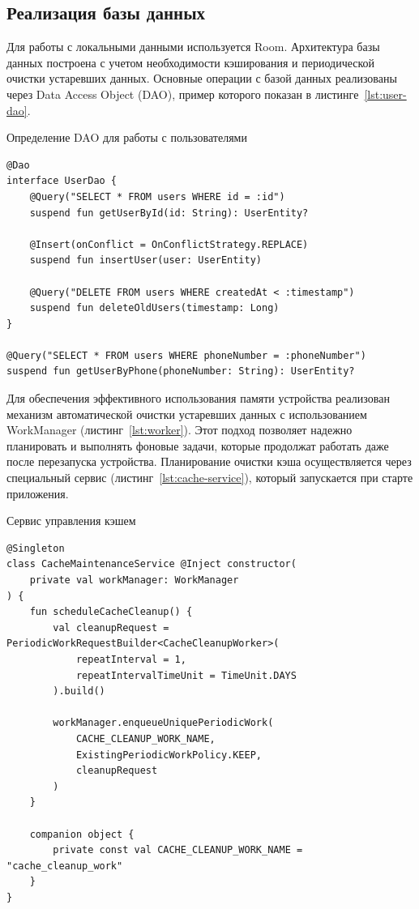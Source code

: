\documentclass[14pt, russian]{scrartcl}
\begin{document}
\subsection{Реализация базы данных}\label{sect:database}

Для работы с локальными данными используется Room. Архитектура базы данных построена с учетом необходимости кэширования и периодической очистки устаревших данных. Основные операции с базой данных реализованы через Data Access Object (DAO), пример которого показан в листинге~\ref{lst:user-dao}.

\begin{listing}[!htb]
\caption{Определение DAO для работы с пользователями}
\vspace{-0.3cm}
\label{lst:user-dao}
\begin{verbatim}
@Dao
interface UserDao {
    @Query("SELECT * FROM users WHERE id = :id")
    suspend fun getUserById(id: String): UserEntity?

    @Insert(onConflict = OnConflictStrategy.REPLACE)
    suspend fun insertUser(user: UserEntity)

    @Query("DELETE FROM users WHERE createdAt < :timestamp")
    suspend fun deleteOldUsers(timestamp: Long)
}

@Query("SELECT * FROM users WHERE phoneNumber = :phoneNumber")
suspend fun getUserByPhone(phoneNumber: String): UserEntity?
\end{verbatim}
\end{listing}

Для обеспечения эффективного использования памяти устройства реализован механизм автоматической очистки устаревших данных с использованием WorkManager (листинг~\ref{lst:worker}). Этот подход позволяет надежно планировать и выполнять фоновые задачи, которые продолжат работать даже после перезапуска устройства. Планирование очистки кэша осуществляется через специальный сервис (листинг~\ref{lst:cache-service}), который запускается при старте приложения.

\begin{listing}[!htb]
\caption{Сервис управления кэшем}
\vspace{-0.3cm}
\label{lst:cache-service}
\begin{verbatim}
@Singleton
class CacheMaintenanceService @Inject constructor(
    private val workManager: WorkManager
) {
    fun scheduleCacheCleanup() {
        val cleanupRequest = PeriodicWorkRequestBuilder<CacheCleanupWorker>(
            repeatInterval = 1,
            repeatIntervalTimeUnit = TimeUnit.DAYS
        ).build()

        workManager.enqueueUniquePeriodicWork(
            CACHE_CLEANUP_WORK_NAME,
            ExistingPeriodicWorkPolicy.KEEP,
            cleanupRequest
        )
    }

    companion object {
        private const val CACHE_CLEANUP_WORK_NAME = "cache_cleanup_work"
    }
}
\end{verbatim}
\end{listing}
\end{document}

